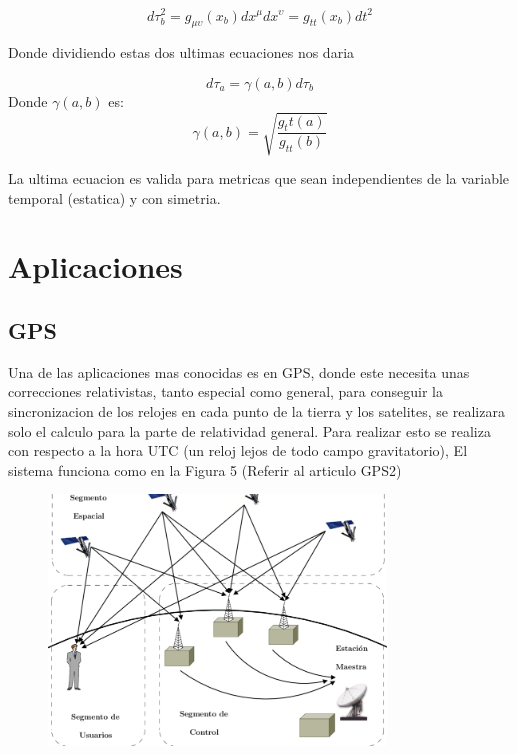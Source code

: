 \documentclass[12pt,twoside]{rif}
\begin{document}
\begin{equation}
d\tau_{b}^{2}=g_{\mu\upsilon}(x_{b})dx^{\mu}dx^{\upsilon}=g_{tt}(x_{b})dt^{2}
\end{equation}

Donde dividiendo estas dos ultimas ecuaciones nos daria 

\begin{equation}
d\tau_{a} =\gamma(a,b) d\tau_{b}
\end{equation}		
Donde $\gamma(a,b)$ es: \\

\begin{equation}
\gamma(a,b)=\sqrt{\frac{g_tt(a)}{g_{tt}(b)}}
\end{equation}

La ultima ecuacion es valida para metricas que sean independientes de la variable temporal (estatica) y con simetria.	
	
	
\section{Aplicaciones}
	
	\subsection{GPS}
	Una de las aplicaciones mas conocidas es en GPS, donde este necesita unas correcciones relativistas, tanto especial como general, para conseguir la sincronizacion de los relojes en cada punto de la tierra y los satelites, se realizara solo el calculo para la parte de relatividad general. Para realizar esto se realiza con respecto a la hora UTC (un reloj lejos de todo campo gravitatorio), El sistema funciona como en la Figura 5
(Referir al articulo GPS2)
	\begin{center}
	\begin{figure}
	\includegraphics[width=0.8\textwidth]{img/GPS.png}
	\end{figure}
	\end{center}
	
\end{document}
